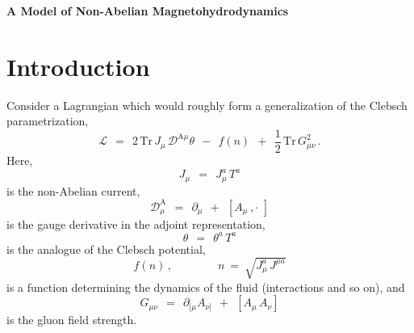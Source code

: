 \documentclass[epsfig,12pt]{article}
\def\beq{\begin{equation}}
\def\eeq{\end{equation}}
\newcommand{\p}{\partial}
\newcommand{\md}{\mathcal{D}}
\newcommand{\ml}{\mathcal{L}}
\newcommand{\Tr}{\text{Tr}}
\begin{document}
\begin{titlepage}


\begin{center}
{  \Large \bf  A Model of Non-Abelian Magnetohydrodynamics}
\end{center}

\vspace{2mm}


\end{titlepage}




\section{Introduction}
\setcounter{equation}{0}

	Consider a Lagrangian which would roughly form a generalization of the Clebsch parametrization,
\beq
\label{lagrangian}
	\ml    ~~=~~    2\, \Tr\, J_\mu\,  \md^{\text{A}\mu} \theta   ~~-~~  f(n)  ~~+~~
			\frac{1}{2}\, \Tr\, G_{\mu\nu}^2\,.
\eeq
	Here,
\beq
	J_\mu    ~~=~~    J_\mu^a\, T^a
\eeq
	is the non-Abelian current,
\beq
	\md^\text{A}_\mu    ~~=~~    \p_\mu  ~~+~~  [ A_\mu\,, \cdot\,\, ]
\eeq
	is the gauge derivative in the adjoint representation,
\beq
	\theta    ~~=~~    \theta^a\, T^a
\eeq
	is the analogue of the Clebsch potential,
\beq
	f(n)\,, \qquad\qquad n ~=~ \sqrt{ J_\mu^a\, J^{\mu a} }
\eeq
	is a function determining the dynamics of the fluid (interactions and so on),
	and
\beq
	G_{\mu\nu}    ~~=~~    \p_{[\mu} A_{\nu]}  ~~+~~ [ A_\mu\, A_\nu ]
\eeq
	is the gluon field strength.
\end{document}
